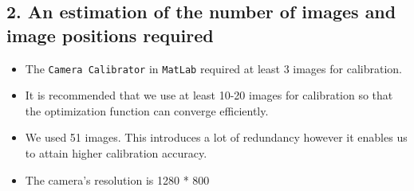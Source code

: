 \subsection*{2. An estimation of the number of images and image positions required}
\begin{itemize}
\item The \texttt{Camera Calibrator} in \texttt{MatLab} required at least 3 images for calibration.
\item It is recommended that we use at least 10-20 images for calibration so that the optimization function can converge efficiently.
\item We used 51 images. This introduces a lot of redundancy however it enables us to attain higher calibration accuracy.
\item The camera's resolution is 1280 * 800
\end{itemize}

